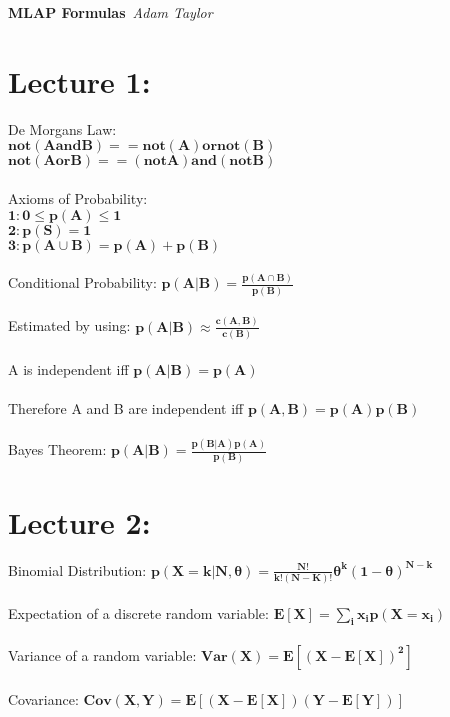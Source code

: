 \documentclass{article}
\begin{document}
\begin{center}
\Large\textbf{MLAP Formulas}\
\large\textit{Adam Taylor}
\newline
\end{center}
\section{Lecture 1:}
De Morgans Law:\\ $\mathbf{not(A and B) == not(A) or not(B)}$\\
$\mathbf{not(A or B) == (not A) and (not B)}$\\\\
Axioms of Probability:\\ $\mathbf{1: 0 \leq p(A) \leq 1}$\\
$\mathbf{2: p(S) = 1}$\\
$\mathbf{3: p(A \cup B ) = p(A) + p(B)}$\\\\
Conditional Probability: $\mathbf {p(A|B) = \frac{p(A\cap B)}{p(B)}}$\\\\
Estimated by using: $\mathbf{p(A|B) \approx \frac{c(A,B)}{c(B)}}$\\\\
A is independent iff $\mathbf{p(A|B) = p(A)}$\\\\
Therefore A and B are independent iff $\mathbf{p(A,B) = p(A)p(B)}$\\\\
Bayes Theorem: $\mathbf{p(A|B) = \frac{p(B|A)p(A)}{p(B)}}$
\section{Lecture 2:}
Binomial Distribution: $\mathbf{p(X = k|N, \theta) = \frac{N!}{k!(N-K)!}\theta^k(1-\theta)^{N-k}}$\\\\
Expectation of a discrete random variable: $\mathbf{E[X] = \sum\limits_{i}^{} x_ip(X=x_i)}$\\\\
Variance of a random variable: $\mathbf{Var(X) = E[(X-E[X])^2]}$\\\\
Covariance: $\mathbf{Cov(X,Y) = E[(X-E[X])(Y-E[Y])]}$
\end{document}

